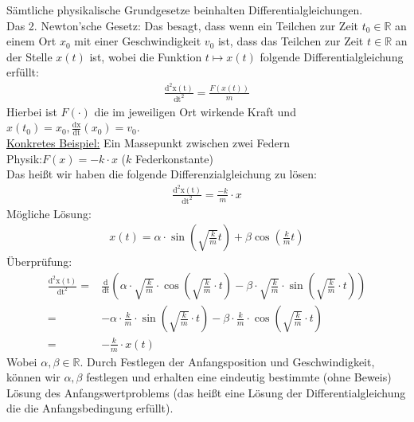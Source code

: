 \begin{Beispiel}{
	Sämtliche physikalische Grundgesetze beinhalten 
	Differentialgleichungen.\\
	Das 2. Newton'sche Gesetz: Das besagt, dass wenn ein Teilchen zur Zeit 
	$t_0 \in \mathbb{R}$ an einem Ort $x_0$ mit einer Geschwindigkeit $v_0$ 
	ist, dass das Teilchen zur Zeit $t \in \mathbb{R}$ an der Stelle 
	$x(t)$ ist, wobei die Funktion $t \mapsto x(t)$ folgende 
	Differentialgleichung erfüllt:
	\begin{align*}
		\frac{\mathrm{d^2x(t)}}{\mathrm{dt^2}} = \frac{F(x(t))}{m}
	\end{align*}
	Hierbei ist $F(\cdot)$ die im jeweiligen Ort wirkende Kraft und \\
	$x(t_0) = x_0, \frac{\mathrm{dx}}{\mathrm{dt}}(x_0) = v_0$.\\
	\underline{Konkretes Beispiel:} Ein Massepunkt zwischen zwei Federn \\
	Physik:$F(x) = -k \cdot x$ ($k$ Federkonstante)\\
	Das heißt wir haben die folgende Differenzialgleichung zu lösen:
	\begin{align*}
		\frac{\mathrm{d^2x(t)}}{\mathrm{dt^2}} = \frac{-k}{m} \cdot x
	\end{align*}
	Mögliche Lösung:
	\begin{align*}
		x(t) = \alpha \cdot \sin\left(\sqrt{\frac{k}{m}}t\right) 
			+ \beta \cos\left(\frac{k}{m}t\right)
	\end{align*}
	Überprüfung:
	\begin{align*}
	\frac{\mathrm{d^2x(t)}}{\mathrm{dt^2}} = 
	&\frac{\mathrm{d}}{\mathrm{dt}} \left(\alpha \cdot \sqrt{\frac{k}{m}} 
		\cdot \cos\left( \sqrt{\frac{k}{m}} \cdot t\right) - \beta \cdot 	
		\sqrt{\frac{k}{m}} \cdot \sin\left( \sqrt{\frac{k}{m}}
		\cdot t\right)\right) \\
	= & - \alpha \cdot \frac{k}{m} \cdot \sin\left(\sqrt{\frac{k}{m}}\cdot t\right)
		- \beta \cdot \frac{k}{m} \cdot \cos\left(\sqrt{\frac{k}{m}} \cdot t\right) 	
		\\
	= & - \frac{k}{m} \cdot x(t)
	\end{align*}
	Wobei $\alpha, \beta \in \mathbb{R}$. Durch Festlegen der 
	Anfangsposition und Geschwindigkeit, können wir $\alpha, \beta$ 
	festlegen und erhalten eine eindeutig bestimmte (ohne Beweis) Lösung 
	des Anfangswertproblems (das heißt eine Lösung der Differentialgleichung 
	die die Anfangsbedingung erfüllt).
}\end{Beispiel}

